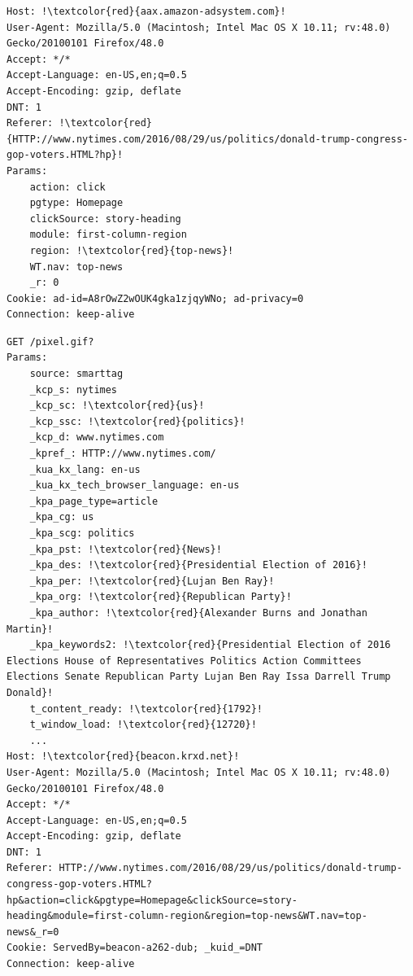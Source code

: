\begin{lstlisting}[frame=single, breaklines=true, keepspaces=true, basicstyle=\tiny, escapechar=!]
Host: !\textcolor{red}{aax.amazon-adsystem.com}!
User-Agent: Mozilla/5.0 (Macintosh; Intel Mac OS X 10.11; rv:48.0)
Gecko/20100101 Firefox/48.0
Accept: */*
Accept-Language: en-US,en;q=0.5
Accept-Encoding: gzip, deflate
DNT: 1
Referer: !\textcolor{red}{HTTP://www.nytimes.com/2016/08/29/us/politics/donald-trump-congress-gop-voters.HTML?hp}!
Params:
    action: click
    pgtype: Homepage
    clickSource: story-heading
    module: first-column-region
    region: !\textcolor{red}{top-news}!
    WT.nav: top-news
    _r: 0
Cookie: ad-id=A8rOwZ2wOUK4gka1zjqyWNo; ad-privacy=0
Connection: keep-alive
\end{lstlisting}

\begin{lstlisting}[frame=single, breaklines=true, keepspaces=true, basicstyle=\tiny, escapechar=!]
GET /pixel.gif?
Params:
    source: smarttag
    _kcp_s: nytimes
    _kcp_sc: !\textcolor{red}{us}!
    _kcp_ssc: !\textcolor{red}{politics}!
    _kcp_d: www.nytimes.com
    _kpref_: HTTP://www.nytimes.com/
    _kua_kx_lang: en-us
    _kua_kx_tech_browser_language: en-us
    _kpa_page_type=article
    _kpa_cg: us
    _kpa_scg: politics
    _kpa_pst: !\textcolor{red}{News}!
    _kpa_des: !\textcolor{red}{Presidential Election of 2016}!
    _kpa_per: !\textcolor{red}{Lujan Ben Ray}!
    _kpa_org: !\textcolor{red}{Republican Party}!
    _kpa_author: !\textcolor{red}{Alexander Burns and Jonathan Martin}!
    _kpa_keywords2: !\textcolor{red}{Presidential Election of 2016 Elections House of Representatives Politics Action Committees Elections Senate Republican Party Lujan Ben Ray Issa Darrell Trump Donald}!
    t_content_ready: !\textcolor{red}{1792}!
    t_window_load: !\textcolor{red}{12720}!
    ...
Host: !\textcolor{red}{beacon.krxd.net}!
User-Agent: Mozilla/5.0 (Macintosh; Intel Mac OS X 10.11; rv:48.0) Gecko/20100101 Firefox/48.0
Accept: */*
Accept-Language: en-US,en;q=0.5
Accept-Encoding: gzip, deflate
DNT: 1
Referer: HTTP://www.nytimes.com/2016/08/29/us/politics/donald-trump-congress-gop-voters.HTML?hp&action=click&pgtype=Homepage&clickSource=story-heading&module=first-column-region&region=top-news&WT.nav=top-news&_r=0
Cookie: ServedBy=beacon-a262-dub; _kuid_=DNT
Connection: keep-alive
\end{lstlisting}

